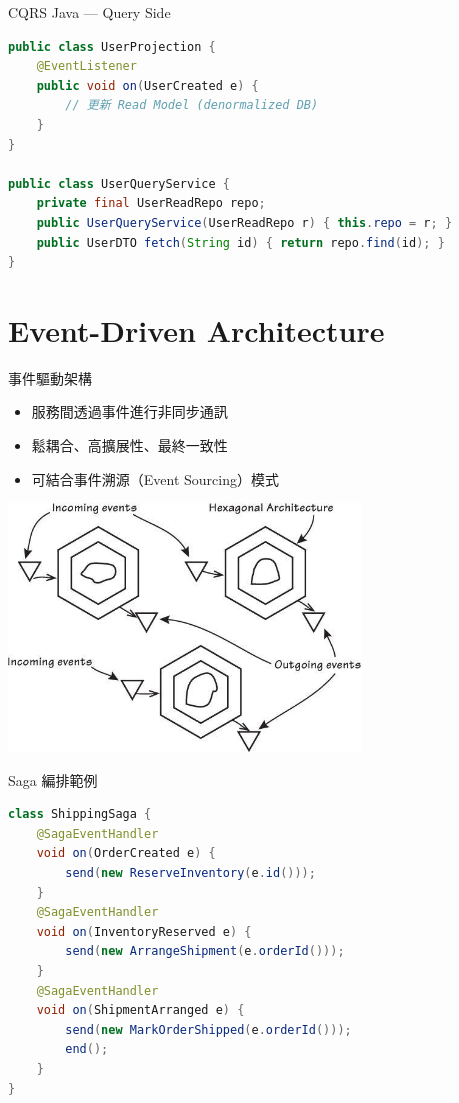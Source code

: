 \documentclass[UTF8]{beamer}
\begin{document}
\begin{frame}[fragile]{CQRS Java — Query Side}
\begin{lstlisting}[language=Java]
public class UserProjection {
    @EventListener
    public void on(UserCreated e) {
        // 更新 Read Model (denormalized DB)
    }
}

public class UserQueryService {
    private final UserReadRepo repo;
    public UserQueryService(UserReadRepo r) { this.repo = r; }
    public UserDTO fetch(String id) { return repo.find(id); }
}
\end{lstlisting}
\end{frame}


\section{Event-Driven Architecture}
\begin{frame}{事件驅動架構}
    \begin{itemize}
        \item 服務間透過事件進行非同步通訊
        \item 鬆耦合、高擴展性、最終一致性
        \item 可結合事件溯源（Event Sourcing）模式
    \end{itemize}
    \begin{center}
        \includegraphics[width=0.7\textwidth]{img/event-driven-hex.png}
    \end{center}
\end{frame}

\begin{frame}[fragile]{Saga 編排範例}
\begin{lstlisting}[language=Java]
class ShippingSaga {
    @SagaEventHandler
    void on(OrderCreated e) {
        send(new ReserveInventory(e.id()));
    }
    @SagaEventHandler
    void on(InventoryReserved e) {
        send(new ArrangeShipment(e.orderId()));
    }
    @SagaEventHandler
    void on(ShipmentArranged e) {
        send(new MarkOrderShipped(e.orderId()));
        end();
    }
}
\end{lstlisting}
\end{frame}
\end{document}

